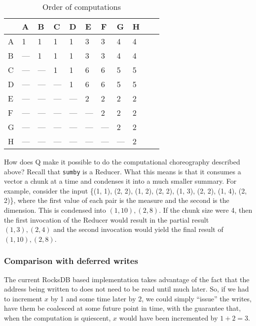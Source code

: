 \begin{table}[hbtp]
\centering
\begin{tabular}{|l|l|l|l|l|l|l|l|l|l|l|} \hline \hline
  & A   & B   & C   & D   & E   & F   & G   & H \\ \hline
A &  1  &  1  &  1  &  1  &  3  &  3  &  4  &  4  \\ \hline
B & --- &  1  &  1  &  1  &  3  &  3  &  4  &  4  \\ \hline
C & --- & --- &  1  &  1  &  6  &  6  &  5  &  5  \\ \hline
D & --- & --- & --- &  1  &  6  &  6  &  5  &  5  \\ \hline
E & --- & --- & --- & --- &  2  &  2  &  2  &  2  \\ \hline
F & --- & --- & --- & --- & --- &  2  &  2  &  2  \\ \hline
G & --- & --- & --- & --- & --- & --- &  2  &  2  \\ \hline
H & --- & --- & --- & --- & --- & --- & --- &  2  \\ \hline

\end{tabular}
\caption{Order of computations}
\label{tbl_choreography}
\end{table}

How does Q make it possible to do the computational choreography described
above? Recall that {\tt sumby} is a Reducer. What this means is that it consumes
a vector a chunk at a time and condenses it into a much smaller summary. 
For example, consider the input 
\{(1, 1), (2, 2), (1, 2), (2, 2), (1, 3), (2, 2), (1, 4), (2, 2)\}, where the
first value of each pair is the measure and the second is the dimension.
This is condensed
into \((1, 10), (2, 8)\). If the chunk size were 4, then the first invocation of
the Reducer 
would result in the partial result 
\((1, 3), (2, 4)\) and the second invocation 
would yield the final result of 
\((1, 10), (2, 8)\). 

\subsubsection{Comparison with deferred writes}

The current RocksDB based implementation takes advantage of the fact that the
address being written to does not need to be read until much later. So, if we
had to increment \(x\) by 1 and some time later by \(2\), we could simply
``issue'' the writes, have them be coalesced at some future point in time, with
the guarantee that, when the computation is quiescent, \(x\) would have been
incremented by \(1 + 2 = 3\).

